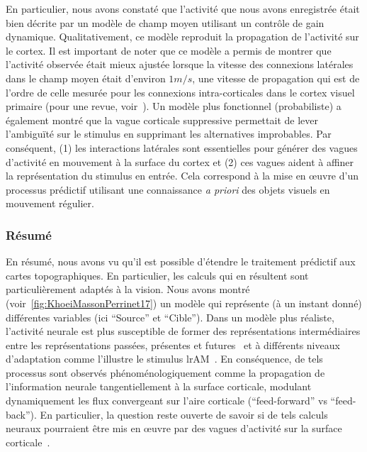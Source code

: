 En particulier, nous avons constaté que l'activité que nous avons
enregistrée était bien décrite par un modèle de champ moyen utilisant un
contrôle de gain dynamique. Qualitativement, ce modèle reproduit la
propagation de l'activité sur le cortex. Il est important de noter que
ce modèle a permis de montrer que l'activité observée était mieux
ajustée lorsque la vitesse des connexions latérales dans le champ moyen
était d'environ $1 m/s$, une vitesse de propagation qui est de l'ordre de
celle mesurée pour les connexions intra-corticales dans le cortex visuel
primaire (pour une revue, voir~\citep{Muller18}). Un modèle plus
fonctionnel (probabiliste) a également montré que la vague
corticale suppressive permettait de lever l'ambiguïté sur le stimulus en supprimant
les alternatives improbables. Par conséquent,
(1) les interactions latérales sont essentielles pour générer des vagues d'activité
en mouvement à la surface du cortex et (2) ces vagues aident à affiner la représentation
du stimulus en entrée. Cela correspond à la mise en œuvre d'un processus
prédictif utilisant une connaissance \emph{a priori} des objets visuels
en mouvement régulier.


\subsubsection{Résumé}
En résumé, nous avons vu qu'il est possible d'étendre le traitement
prédictif aux cartes topographiques. En particulier, les calculs qui en
résultent sont particulièrement adaptés à la vision. Nous avons montré
(voir~\ref{fig:KhoeiMassonPerrinet17}) un modèle qui représente (à un instant donné) différentes
variables (ici ``Source'' et ``Cible''). Dans un modèle plus réaliste,
l'activité neurale est plus susceptible de former des représentations
intermédiaires entre les représentations passées, présentes et futures~\citep{Glaser18} et à différents niveaux d'adaptation comme
l'illustre le stimulus lrAM~\citep{Chemla19}. En conséquence, de
tels processus sont observés phénoménologiquement comme la propagation
de l'information neurale tangentiellement à la surface corticale,
modulant dynamiquement les flux convergeant sur l'aire corticale (``feed-forward'' vs ``feed-back''). En
particulier, la question reste ouverte de savoir si de tels calculs
neuraux pourraient être mis en œuvre par des vagues d'activité sur la
surface corticale~\citep{Muller18}.

